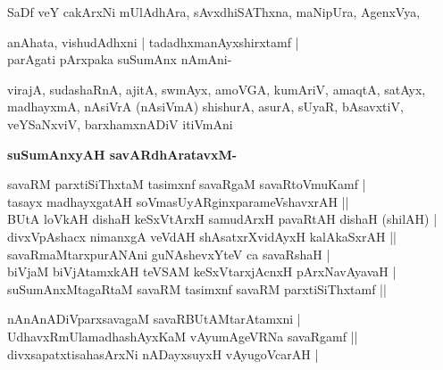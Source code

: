 \begin{artha}
SaDf veY cakArxNi mUlAdhAra, sAvxdhiSAThxna, maNipUra, AgenxVya,
\end{artha}

\begin{shloka}
anAhata, vishudAdhxni | tadadhxmanAyxshirxtamf |\\\label{154}\label{155}
parAgati pArxpaka suSumAnx nAmAni-
\end{shloka}

\begin{artha}
virajA, sudashaRnA, ajitA, swmAyx, amoVGA, kumAriV, amaqtA, satAyx, madhayxmA, nAsiVrA (nAsiVmA) shishurA, asurA, sUyaR, bAsavxtiV, veYSaNxviV, barxhamxnADiV itiVmAni
\end{artha}

\newpage

{\bigskip
\noindent
{\large\bf suSumAnxyAH savARdhAratavxM-}}
\medskip

\begin{shloka}
savaRM parxtiSiThxtaM tasimxnf savaRgaM savaRtoVmuKamf |\\
tasayx madhayxgatAH soVmasUyARginxparameVshavxrAH ||\\
BUtA loVkAH dishaH keSxVtArxH samudArxH pavaRtAH dishaH (shilAH) |\\
divxVpAshacx nimanxgA veVdAH shAsatxrXvidAyxH kalAkaSxrAH ||\\
savaRmaMtarxpurANAni guNAshevxYteV ca savaRshaH |\\
biVjaM biVjAtamxkAH teVSAM keSxVtarxjAcnxH pArxNavAyavaH |\\
suSumAnxMtagaRtaM savaRM tasimxnf savaRM parxtiSiThxtamf ||
\end{shloka}


\begin{shloka}
nAnAnADiVparxsavagaM savaRBUtAMtarAtamxni |\\\label{155}
UdhavxRmUlamadhashAyxKaM vAyumAgeVRNa savaRgamf ||\\
divxsapatxtisahasArxNi nADayxsuyxH vAyugoVcarAH |\label{155}
\end{shloka}

